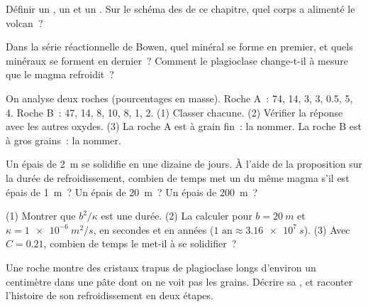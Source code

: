 \begin{exercise}[$\star$]\label{exo:g11:igneous-rocks:4}
Définir un , un  et un . Sur le schéma des  de ce
chapitre, quel corps a alimenté le volcan~?
\end{exercise}

\begin{exercise}[$\star$]\label{exo:g11:igneous-rocks:5}
Dans la série réactionnelle de Bowen, quel minéral se forme en premier, et
quels minéraux se forment en dernier~? Comment le plagioclase change-t-il
à mesure que le magma refroidit~?
\end{exercise}

\begin{exercise}[$\star\star$]\label{exo:g11:igneous-rocks:6}
On analyse deux roches (pourcentages en masse). Roche A~:  74,
 14,  3,  3,  0.5,  5,  4.
Roche B~:
 47,  14,  8,  10,  8, 
1,  2. (1) Classer chacune. (2) Vérifier la réponse avec les autres
oxydes. (3) La roche A est à grain fin~: la nommer. La roche B est à gros
grains~: la nommer.
\end{exercise}

\begin{exercise}[$\star\star$]\label{exo:g11:igneous-rocks:7}
Un  épais de \qty{2}{m} se solidifie en une dizaine de jours. À l'aide
de la proposition sur la durée de refroidissement, combien de temps met un
 du même magma s'il est épais de \qty{1}{m}~? Un  épais de
\qty{20}{m}~? Un  épais de \qty{200}{m}~?
\end{exercise}

\begin{exercise}[$\star\star$]\label{exo:g11:igneous-rocks:8}
(1) Montrer que $b^2/\kappa$ est une durée. (2) La calculer pour
$b = \qty{20}{m}$ et $\kappa = \qty{1e-6}{m^2/s}$, en secondes et en années
($\num{1}\text{ an} \approx \qty{3.16e7}{s}$). (3) Avec $C = 0.21$,
combien de temps le  met-il à se solidifier~?
\end{exercise}

\begin{exercise}[$\star\star$]\label{exo:g11:igneous-rocks:9}
Une roche montre des cristaux trapus de plagioclase longs d'environ un
centimètre dans une pâte dont on ne voit pas les grains. Décrire sa
, et raconter l'histoire de son refroidissement en deux étapes.
\end{exercise}

